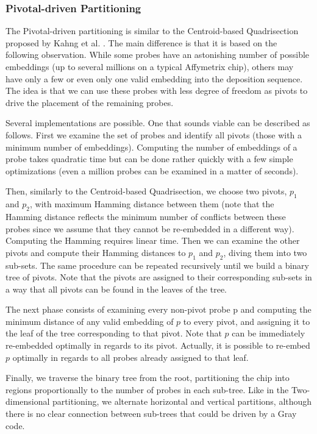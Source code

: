 \documentclass{article}
\begin{document}
\subsubsection{Pivotal-driven Partitioning}

The Pivotal-driven partitioning is similar to the Centroid-based Quadrisection proposed by Kahng et al. \cite{KAHNG03B}. The main difference is that it is based on the following observation. While some probes have an astonishing number of possible embeddings (up to several millions on a typical Affymetrix chip), others may have only a few or even only one valid embedding into the deposition sequence. The idea is that we can use these probes with less degree of freedom as pivots to drive the placement of the remaining probes. 

Several implementations are possible. One that sounds viable can be described as follows. First we examine the set of probes and identify all pivots (those with a minimum number of embeddings). Computing the number of embeddings of a probe takes quadratic time but can be done rather quickly with a few simple optimizations (even a million probes can be examined in a matter of seconds). 

Then, similarly to the Centroid-based Quadrisection, we choose two pivots, $p_1$ and $p_2$, with maximum Hamming distance between them (note that the Hamming distance reflects the minimum number of conflicts between these probes since we assume that they cannot be re-embedded in a different way). Computing the Hamming requires linear time. Then we can examine the other pivots and compute their Hamming distances to $p_1$ and $p_2$, diving them into two sub-sets. The same procedure can be repeated recursively until we build a binary tree of pivots. Note that the pivots are assigned to their corresponding sub-sets in a way that all pivots can be found in the leaves of the tree. 

The next phase consists of examining every non-pivot probe p and computing the minimum distance of any valid embedding of $p$ to every pivot, and assigning it to the leaf of the tree corresponding to that pivot. Note that $p$ can be immediately re-embedded optimally in regards to its pivot. Actually, it is possible to re-embed $p$ optimally in regards to all probes already assigned to that leaf. 

Finally, we traverse the binary tree from the root, partitioning the chip into regions proportionally to the number of probes in each sub-tree. Like in the Two-dimensional partitioning, we alternate horizontal and vertical partitions, although there is no clear connection between sub-trees that could be driven by a Gray code.
\end{document}
